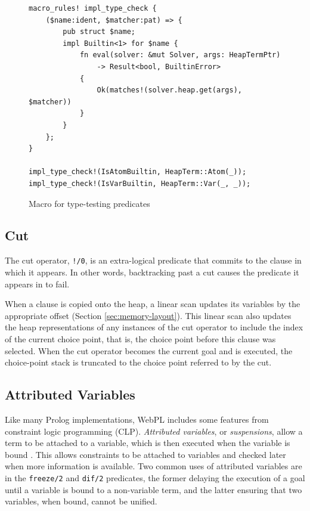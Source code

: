 \begin{figure}[H]
\centering
\begin{verbatim}
macro_rules! impl_type_check {
    ($name:ident, $matcher:pat) => {
        pub struct $name;
        impl Builtin<1> for $name {
            fn eval(solver: &mut Solver, args: HeapTermPtr)
                -> Result<bool, BuiltinError>
            {
                Ok(matches!(solver.heap.get(args), $matcher))
            }
        }
    };
}

impl_type_check!(IsAtomBuiltin, HeapTerm::Atom(_));
impl_type_check!(IsVarBuiltin, HeapTerm::Var(_, _));
\end{verbatim}
\caption{Macro for type-testing predicates}
\label{fig:builtin-macro}
\end{figure}

\subsection{Cut}

The cut operator, \texttt{!/0}, is an extra-logical predicate that commits to the clause in which it appears. In other words, backtracking past a cut causes the predicate it appears in to fail.

When a clause is copied onto the heap, a linear scan updates its variables by the appropriate offset (Section \ref{sec:memory-layout}). This linear scan also updates the heap representations of any instances of the cut operator to include the index of the current choice point, that is, the choice point before this clause was selected. When the cut operator becomes the current goal and is executed, the choice-point stack is truncated to the choice point referred to by the cut.

\subsection{Attributed Variables}

\label{sec:attributed-variables}

Like many Prolog implementations, WebPL includes some features from constraint logic programming (CLP). \emph{Attributed variables}, or \emph{suspensions}, allow a term to be attached to a variable, which is then executed when the variable is bound \cite{holzbaurMetastructuresvsattributed1992}. This allows constraints to be attached to variables and checked later when more information is available. Two common uses of attributed variables are in the \texttt{freeze/2} and \texttt{dif/2} predicates, the former delaying the execution of a goal until a variable is bound to a non-variable term, and the latter ensuring that two variables, when bound, cannot be unified.

